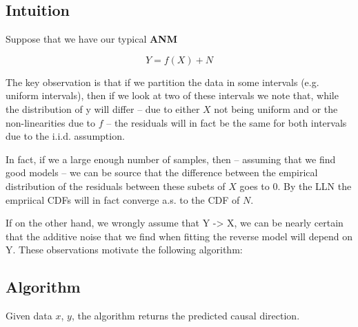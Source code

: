 \subsection{Intuition}
    
Suppose that we have our typical \textbf{ANM} 

$$
    Y = f(X) + N
$$ 

The key observation is that if we partition the
data in some intervals (e.g. uniform intervals), then if we look at two of these intervals we note that, while
the distribution of y will differ -- due to either $X$ not being uniform and or the non-linearities due to $f$ -- 
the residuals will in fact be the same for both intervals due to the i.i.d. assumption. 

In fact, if we a large enough number of samples, then -- assuming that we find good models -- we can be source
that the difference between the empirical distribution of the residuals between these subets of $X$ goes to $0$.
By the LLN the empriical CDFs will in fact converge a.s. to the CDF of $N$.

If on the other hand, we wrongly assume that Y -> X, we can be nearly certain that the additive noise that we 
find when fitting the reverse model will depend on Y. These observations motivate the following algorithm:



\subsection{Algorithm}

\begin{algorithm}[H]
\caption{Given data $x$, $y$, the algorithm returns the predicted causal direction.
    \label{alg:twinscore}}
\begin{algorithmic}[1]
    \Statex
        
    \EndFor


    \State {}
    \EndFunction
\end{algorithmic}
\end{algorithm}


